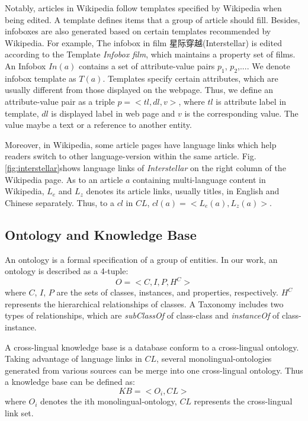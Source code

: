 \documentclass[runningheads,a4paper]{llncs}
\begin{document}
\begin{CJK*}{UTF8}{song}
Notably, articles in Wikipedia follow templates specified by Wikipedia when being edited. A template defines items that a group of article should fill. Besides, infoboxes are also generated based on certain templates recommended by Wikipedia. For example, The infobox in film 星际穿越(Interstellar) is edited according to the Template \emph{Infobox film}, which maintains a property set of films. An Infobox $In(a)$ contains a set of attribute-value pairs {$p_{1}$, $p_{2}$,...}. We denote infobox template as $T(a)$. Templates specify certain attributes, which are usually different from those displayed on the webpage. Thus, we define an attribute-value pair as a triple $p=<tl,dl,v>$, where $tl$ is attribute label in template, $dl$ is displayed label in web page and $v$ is the corresponding value. The value maybe a text or a reference to another entity.

Moreover, in Wikipedia, some article pages have language links which help readers switch to other language-version within the same article. Fig. \ref{fig:interstellar}shows language links of \emph{Interstellar} on the right column of the Wikipedia page. As to an article $a$ containing multi-language content in Wikipedia, $L_{e}$ and $L_{z}$ denotes its article links, usually titles, in English and Chinese separately. Thus, to a $cl$ in $CL$, $cl(a) = <L_{e}(a), L_{z}(a)>$.

\subsection{Ontology and Knowledge Base}

An ontology is a formal specification of a group of entities. In our work, an ontology is described as a 4-tuple:
\begin{equation}
    O = <C,I,P,H^C>
\end{equation}
where $C$, $I$, $P$ are the sets of classes, instances, and properties, respectively. $H^C$ represents the hierarchical relationships of classes. A Taxonomy includes two types of relationships, which are \textit{subClassOf} of class-class and \textit{instanceOf} of class-instance.

A cross-lingual knowledge base is a database conform to a cross-lingual ontology. Taking advantage of language links in $CL$, several monolingual-ontologies generated from various sources can be merge into one cross-lingual ontology.  Thus a knowledge base can be defined as:
\begin{equation}
    KB = <O_{i}, CL>
\end{equation}
where $O_{i}$ denotes the ith monolingual-ontology, $CL$ represents the cross-lingual link set.


\end{CJK*}
\end{document}
